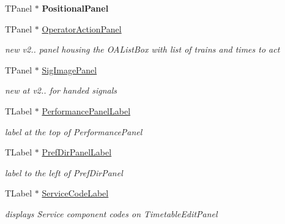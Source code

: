 \begin{DoxyCompactItemize}
\mbox{\label{class_t_interface_a0e02497aefb9ea945fd1cab9999e792e}} 
T\+Panel $\ast$ {\bfseries Positional\+Panel}
\item 
\mbox{\label{class_t_interface_aa17115ed5820e0ff28801224b6bc4e4a}} 
T\+Panel $\ast$ \mbox{\hyperlink{class_t_interface_aa17115ed5820e0ff28801224b6bc4e4a}{Operator\+Action\+Panel}}
\begin{DoxyCompactList}\small\item\em new v2.. panel housing the O\+A\+List\+Box with list of trains and times to act \end{DoxyCompactList}\item 
\mbox{\label{class_t_interface_af41c6bc50047eefe265dcba25d329b0c}} 
T\+Panel $\ast$ \mbox{\hyperlink{class_t_interface_af41c6bc50047eefe265dcba25d329b0c}{Sig\+Image\+Panel}}
\begin{DoxyCompactList}\small\item\em new at v2.. for handed signals \end{DoxyCompactList}\item 
\mbox{\label{class_t_interface_a4b97febf985f3a4a5589f98fed9177ee}} 
T\+Label $\ast$ \mbox{\hyperlink{class_t_interface_a4b97febf985f3a4a5589f98fed9177ee}{Performance\+Panel\+Label}}
\begin{DoxyCompactList}\small\item\em label at the top of Performance\+Panel \end{DoxyCompactList}\item 
\mbox{\label{class_t_interface_acda3257c436e44b30e93d92fee4f1ae9}} 
T\+Label $\ast$ \mbox{\hyperlink{class_t_interface_acda3257c436e44b30e93d92fee4f1ae9}{Pref\+Dir\+Panel\+Label}}
\begin{DoxyCompactList}\small\item\em label to the left of Pref\+Dir\+Panel \end{DoxyCompactList}\item 
\mbox{\label{class_t_interface_a8635c7c8d66d2f6f4fd9932488afc044}} 
T\+Label $\ast$ \mbox{\hyperlink{class_t_interface_a8635c7c8d66d2f6f4fd9932488afc044}{Service\+Code\+Label}}
\begin{DoxyCompactList}\small\item\em displays \textquotesingle{}Service component codes\textquotesingle{} on Timetable\+Edit\+Panel \end{DoxyCompactList}\item 

\end{DoxyCompactItemize}
